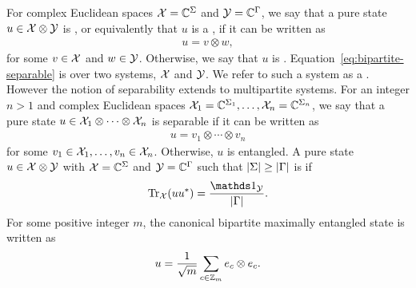 For complex Euclidean spaces $\mathcal{X} = \mathbb{C}^{\Sigma}$ and $\mathcal{Y} = \mathbb{C}^{\Gamma}$, we say that a pure state $u \in \mathcal{X} \otimes \mathcal{Y}$ is , or equivalently that $u$ is a , if it can be written as 
\begin{align} \label{eq:bipartite-separable}
	u = v \otimes w,
\end{align}
for some $v \in \mathcal{X}$ and $w \in \mathcal{Y}$. Otherwise, we say that $u$ is . Equation~\eqref{eq:bipartite-separable} is over two systems, $\mathcal{X}$ and $\mathcal{Y}$. We refer to such a system as a . However the notion of separability extends to multipartite systems. For an integer $n > 1$ and complex Euclidean spaces $\mathcal{X}_1 = \mathbb{C}^{\Sigma_1}, \ldots, \mathcal{X}_n = \mathbb{C}^{\Sigma_n}$, we say that a pure state $u \in \mathcal{X}_1 \otimes \cdots \otimes \mathcal{X}_n$ is separable if it can be written as 
\begin{align}
	u = v_1 \otimes \cdots \otimes v_n
\end{align}
for some $v_1 \in \mathcal{X}_1, \ldots, v_n \in \mathcal{X}_n$. Otherwise, $u$ is entangled. A pure state $u \in \mathcal{X} \otimes \mathcal{Y}$ with $\mathcal{X} = \mathbb{C}^{\Sigma}$ and $\mathcal{Y} = \mathbb{C}^{\Gamma}$ such that $\left\lvert \Sigma \right\rvert \geq \left\lvert \Gamma \right\rvert$ is  if 
\begin{align}
	\tr_{\X}(uu^*) = \frac{\I_{\Y}}{\abs{\Gamma}}.
\end{align}
For some positive integer $m$, the canonical bipartite maximally entangled state is written as 
\begin{align}
	u = \frac{1}{\sqrt{m}} \sum_{c \in \mathbb{Z}_m} e_c \otimes e_c.
\end{align}


